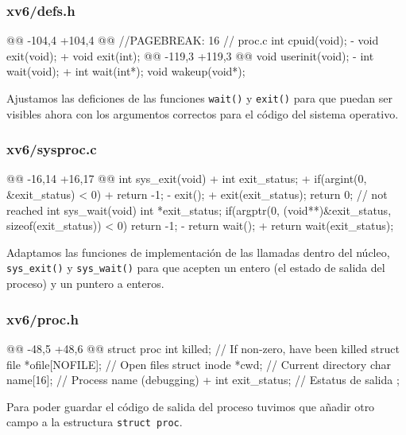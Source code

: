 \subsubsection{xv6/defs.h}
\begin{listing}
@@ -104,4 +104,4 @@
//PAGEBREAK: 16
// proc.c
    int             cpuid(void);
-   void            exit(void);
+   void            exit(int);
@@ -119,3 +119,3 @@
    void            userinit(void);
-   int             wait(void);
+   int             wait(int*);
    void            wakeup(void*);
\end{listing}
\par Ajustamos las deficiones de las funciones \texttt{wait()} y \texttt{exit()}
para que puedan ser visibles ahora con los argumentos correctos para el código del sistema operativo.

\subsubsection{xv6/sysproc.c}
\begin{listing}
@@ -16,14 +16,17 @@
    int
    sys_exit(void)
    {
+       int exit_status;
+       if(argint(0, &exit_status) < 0)
+           return -1;
-       exit();
+       exit(exit_status);
        return 0;  // not reached
    }
    int
    sys_wait(void)
    {
        int *exit_status;
        if(argptr(0, (void**)&exit_status, sizeof(exit_status)) < 0)
            return -1;
-       return wait();
+       return wait(exit_status);
    }
\end{listing}
\par Adaptamos las funciones de implementación de las llamadas dentro del núcleo, \\
\texttt{sys\_exit()} y \texttt{sys\_wait()} para que acepten un entero (el estado 
de salida del proceso) y un puntero a enteros.

\subsubsection{xv6/proc.h}
\begin{listing}
@@ -48,5 +48,6 @@ struct proc {
        int killed;                  // If non-zero, have been killed
        struct file *ofile[NOFILE];  // Open files
        struct inode *cwd;           // Current directory
        char name[16];               // Process name (debugging)
+       int exit_status;             // Estatus de salida
    };
\end{listing}
\par Para poder guardar el código de salida del proceso tuvimos que añadir otro campo a la estructura \texttt{struct proc}.


